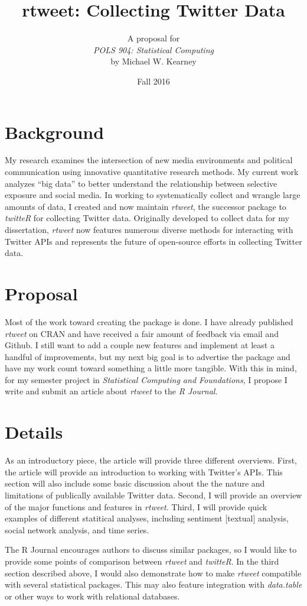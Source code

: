 \documentclass[12pt,english]{article}
\title{\textbf{rtweet: Collecting Twitter Data}}
\author{A proposal for \\\emph{POLS 904: Statistical Computing} \\ by Michael W. Kearney}
\date{Fall 2016}
\begin{document}
\maketitle

\section{Background}

My research examines the intersection of new media environments and
political communication using innovative quantitative research methods.
My current work analyzes ``big data'' to better understand the
relationship between selective exposure and social media. In working to systematically collect and wrangle large amounts of data,
I created and now maintain \emph{rtweet}, the successor package to
\emph{twitteR} for collecting Twitter data. Originally developed to collect
data for my dissertation, \emph{rtweet} now features numerous diverse
methods for interacting with Twitter APIs and represents the future of
open-source efforts in collecting Twitter data.

\section{Proposal}

Most of the work toward creating the package is done. I have
already published \textit{rtweet} on CRAN and have received a fair amount
of feedback via email and Github. I still want to add a couple new
features and implement at least a handful of improvements, but my
next big goal is to advertise the package and have my work count toward
something a little more tangible. With this in mind, for my semester project
in \textit{Statistical Computing and Foundations}, I propose I write and
submit an article about \textit{rtweet} to the \textit{R Journal}.

\section{Details}

As an introductory piece, the article will provide three different overviews.
First, the article will provide an introduction to working with
Twitter’s APIs. This section will also include some basic discussion about the
the nature and limitations of publically available Twitter data. Second,
I will provide an overview of the major functions and features in
\textit{rtweet}. Third, I will provide quick examples of different statitical
analyses, including sentiment [textual] analysis, social network analysis,
and time series.

The R Journal encourages authors to discuss similar packages, so I would like
to provide some points of comparison between \textit{rtweet} and \textit{twitteR}. In the third section described above, I would also demonstrate
how to make \textit{rtweet} compatible with several statistical packages.
This may also feature integration with \textit{data.table} or other ways
to work with relational databases.
\end{document}
